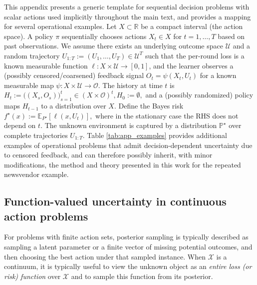 \documentclass[11pt]{article}
\renewcommand{\P}{\mathbb{P}}
\providecommand{\cX}{\mathcal{X}}
\begin{document}
This appendix presents a generic template for sequential decision problems with scalar actions used implicitly throughout the main text, and provides a mapping for several operational examples.
Let $X\subset \mathbb{R}$ be a compact interval (the action space).
A policy $\pi$ sequentially chooses actions $X_t\in X$ for $t=1,\dots,T$ based on past observations.
We assume there exists an underlying outcome space $\mathcal{U}$ and a random trajectory
$U_{1:T}:=(U_1,\dots,U_T)\in\mathcal{U}^T$ such that the per-round loss is a known measurable function
$\ell: X\times\mathcal{U}\to[0,1]$, and the learner observes a (possibly censored/coarsened) feedback signal
\(
O_t = \psi(X_t, U_t)
\)
for a known measurable map $\psi: X\times\mathcal{U}\to\mathcal{O}$.
The history at time $t$ is
\(
H_t := \bigl( (X_s,O_s)\bigr)_{s=1}^t \in (X\times\mathcal{O})^t,  H_0:=\emptyset,
\)
and a (possibly randomized) policy maps $H_{t-1}$ to a distribution over $X$.
Define the Bayes risk
\(
f^\star(x) := \mathbb{E}_{P^\star}\!\left[\ell(x,U_t)\right],
\)
where in the stationary case the RHS does not depend on $t$.
The unknown environment is captured by a distribution $\P^\star$ over complete trajectories $U_{1:T}$. Table \ref{tab:app_examples} provides additional examples of operational problems that admit decision-dependent uncertainty due to censored feedback, and can therefore possibly inherit, with minor modifications, the method and theory presented in this work for the repeated newsvendor example.






















\subsection{Function-valued uncertainty in continuous action problems}
\label{subsec:continuous}
For problems with finite action sets, posterior sampling is typically described as sampling a latent parameter or a finite vector of missing potential outcomes, and then choosing the best action under that sampled instance. When $\cX$ is a continuum, it is typically useful to view the unknown object as an
\emph{entire loss (or risk) function} over $\cX$ and to sample this function from its posterior.
\end{document}
